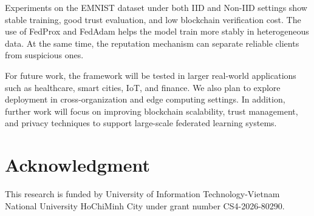 \documentclass[conference, a4paper]{IEEEtran}
\begin{document}
Experiments on the EMNIST dataset under both IID and Non-IID settings show stable training, good trust evaluation, and low blockchain verification cost. The use of FedProx and FedAdam helps the model train more stably in heterogeneous data. At the same time, the reputation mechanism can separate reliable clients from suspicious ones.

For future work, the framework will be tested in larger real-world applications such as healthcare, smart cities, IoT, and finance. We also plan to explore deployment in cross-organization and edge computing settings. In addition, further work will focus on improving blockchain scalability, trust management, and privacy techniques to support large-scale federated learning systems.

\section*{Acknowledgment}
This research is funded by University of Information Technology-Vietnam National University HoChiMinh City under grant number CS4-2026-80290.



\nocite{*}

\end{document}
